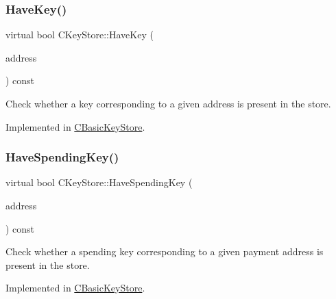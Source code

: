 \subsubsection{\texorpdfstring{Have\+Key()}{HaveKey()}}
{\footnotesize\ttfamily virtual bool C\+Key\+Store\+::\+Have\+Key (\begin{DoxyParamCaption}\item[{const \mbox{\hyperlink{class_c_key_i_d}{C\+Key\+ID}} \&}]{address }\end{DoxyParamCaption}) const\hspace{0.3cm}{\ttfamily [pure virtual]}}



Check whether a key corresponding to a given address is present in the store. 



Implemented in \mbox{\hyperlink{class_c_basic_key_store_afc99762e3e58f93e198d85ecfdf5804a}{C\+Basic\+Key\+Store}}.

\mbox{\label{class_c_key_store_a15590101690f5a691b04a5498453b66a}} 
\subsubsection{\texorpdfstring{Have\+Spending\+Key()}{HaveSpendingKey()}}
{\footnotesize\ttfamily virtual bool C\+Key\+Store\+::\+Have\+Spending\+Key (\begin{DoxyParamCaption}\item[{const libzcash\+::\+Payment\+Address \&}]{address }\end{DoxyParamCaption}) const\hspace{0.3cm}{\ttfamily [pure virtual]}}



Check whether a spending key corresponding to a given payment address is present in the store. 



Implemented in \mbox{\hyperlink{class_c_basic_key_store_a513367bd0a576e088e3f577686fa1ef5}{C\+Basic\+Key\+Store}}.

\mbox{\label{class_c_key_store_a15066cfd57feaffe0b9f4103c9311109}} 
